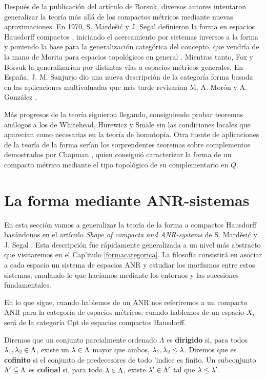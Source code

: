 Después de la publicación del artículo de Borsuk, diversos autores intentaron generalizar la teoría más allá de los compactos métricos mediante nuevas aproximaciones. En 1970, S. Marde\v si\'c y J. Segal definieron la forma en espacios Hausdorff compactos \cite{Mardešić1970,Mardešić1971}, iniciando el acercamiento por sistemas inversos a la forma y poniendo la base para la generalización categórica del concepto, que vendría de la mano de Morita para espacios topológicos en general \cite{Morita1975}. Mientras tanto, Fox \cite{Fox1972} y  Borsuk \cite{borsuk1975} la generalizarían por distintas vías a espacios métricos generales. En Espa\~na, J. M. Sanjurjo dio una nueva descripción de la categoría forma basada en las aplicaciones multivaluadas \cite{sanjurjo_1990,sanjurjo_1992} que más tarde revisarían M. A. Morón y A. González \cite{ALONSOMORON2008972}.

Más progresos de la teoría siguieron llegando, consiguiendo probar teoremas análogos a los de Whitehead, Hurewicz \cite{Morita1975} y Smale \cite{dydak1978whitehead} sin las condiciones locales que aparecían como necesarias en la teoría de homotopía. Otra fuente de aplicaciones de la teoría de la forma serían los sorprendentes teoremas sobre complementos demostrados por Chapman \cite{chapman1972some,chapman1972shapes}, quien consiguió caracterizar la forma de un compacto métrico mediante el tipo topológico de su complementario en $ Q  $. 




\section{La forma mediante ANR-sistemas}\label{seccionanr}
En esta sección vamos a generalizar la teoría de la forma a compactos Hausdorff basándonos en el artículo \textit{Shape of compacta and ANR-systems} de S. Mard\v esi\'c y J. Segal \cite{Mardešić1971}. Esta descripción fue rápidamente generalizada a un nivel más abstracto que visitaremos en el Cap'itulo \ref{formacategorica}. La filosofía consistirá en asociar a cada espacio un sistema de espacios ANR y estudiar los morfismos entre estos sistemas, emulando lo que hacíamos mediante los entornos y las sucesiones fundamentales.

En lo que sigue, cuando hablemos de un ANR nos referiremos a un compacto ANR para la categoría de espacios métricos; cuando hablemos de un espacio $ X  $, será de la categoría Cpt de espacios compactos Hausdorff. 

\begin{definition}
    Diremos que un conjunto parcialmente ordenado $\Lambda $ es \textbf{dirigido} si, para todos $\lambda_1,\lambda_2\in \Lambda $, existe un $\lambda\in \Lambda $ mayor que ambos, $\lambda_1,\lambda_2\leq \lambda $. Diremos que es \textbf{cofinito} si el conjunto de predecesores de todo 'indice es finito. Un subconjunto $\Lambda'\subseteq \Lambda $ es \textbf{cofinal} si, para todo $\lambda\in \Lambda $, existe $\lambda'\in \Lambda ' $ tal que $\lambda\leq \lambda'$.
\end{definition}


